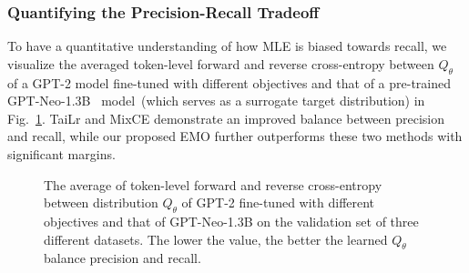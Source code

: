 \subsubsection{Quantifying the Precision-Recall Tradeoff}
\label{appendix:p_r}
To have a quantitative understanding of how MLE is biased towards recall, we visualize the averaged token-level forward and reverse cross-entropy between $Q_{\theta}$ of a GPT-2 model fine-tuned with different objectives and that of a pre-trained GPT-Neo-1.3B~\citep{gpt-neo} model~(which serves as a surrogate target distribution) in Fig.~\ref{fig:p_r}. TaiLr and MixCE demonstrate an improved balance between precision and recall, while our proposed EMO further outperforms these two methods with significant margins.
\begin{figure}[h]
    \centering
    \caption{The average of token-level forward and reverse cross-entropy between distribution $Q_{\theta}$ of GPT-2 fine-tuned with different objectives and that of GPT-Neo-1.3B on the validation set of three different datasets. The lower the value, the better the learned $Q_{\theta}$ balance precision and recall.}
    \label{fig:p_r}
\end{figure}

